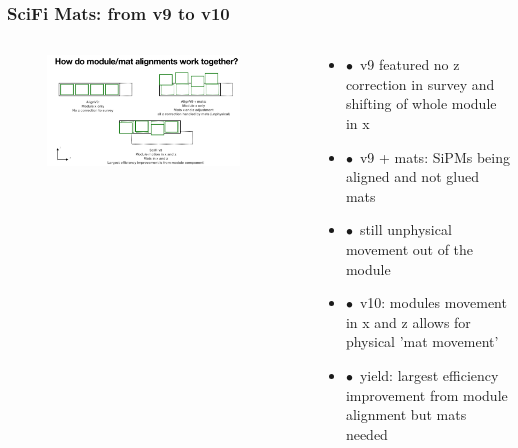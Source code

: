 \documentclass[aspectratio=1610, 12pt, xcolor=dvipsnames]{beamer}
\begin{document}
\begin{frame}\frametitle{SciFi Mats: from v9 to v10}
  \begin{columns}
    \begin{column}[c]{0.48\textwidth}
      \begin{figure}
        \includegraphics[width=0.9\textwidth]{plots/modules_and_mats.png}
      \end{figure}
    \end{column}
    \begin{column}[c]{0.48\textwidth}
      \begin{itemize}
        \item $\bullet$\, v9 featured no z correction in survey and shifting of whole module in x
        \item $\bullet$\, v9 + mats: SiPMs being aligned and not glued mats
        \item $\bullet$\, \to still unphysical movement out of the module
        \item $\bullet$\, v10: modules movement in x and z allows for physical 'mat movement'
        \item $\bullet$\, yield: largest efficiency improvement from module alignment but mats needed
      \end{itemize}
    \end{column}
  \end{columns}
\end{frame}
\end{document}
